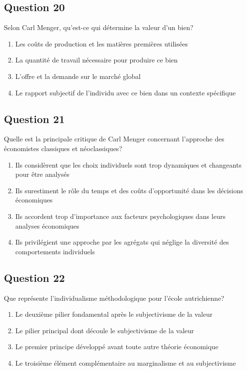 \documentclass[12pt,a4paper]{article}
\begin{document}
\bigskip


\subsection*{Question 20}
Selon Carl Menger, qu'est-ce qui détermine la valeur d'un bien?

\begin{enumerate}[label=\Alph*., leftmargin=*]
\item Les coûts de production et les matières premières utilisées
\item La quantité de travail nécessaire pour produire ce bien
\item L'offre et la demande sur le marché global
\item Le rapport subjectif de l'individu avec ce bien dans un contexte spécifique
\end{enumerate}

\bigskip


\subsection*{Question 21}
Quelle est la principale critique de Carl Menger concernant l'approche des économistes classiques et néoclassiques?

\begin{enumerate}[label=\Alph*., leftmargin=*]
\item Ils considèrent que les choix individuels sont trop dynamiques et changeants pour être analysés
\item Ils surestiment le rôle du temps et des coûts d'opportunité dans les décisions économiques
\item Ils accordent trop d'importance aux facteurs psychologiques dans leurs analyses économiques
\item Ils privilégient une approche par les agrégats qui néglige la diversité des comportements individuels
\end{enumerate}

\bigskip


\subsection*{Question 22}
Que représente l'individualisme méthodologique pour l'école autrichienne?

\begin{enumerate}[label=\Alph*., leftmargin=*]
\item Le deuxième pilier fondamental après le subjectivisme de la valeur
\item Le pilier principal dont découle le subjectivisme de la valeur
\item Le premier principe développé avant toute autre théorie économique
\item Le troisième élément complémentaire au marginalisme et au subjectivisme
\end{enumerate}
\end{document}
